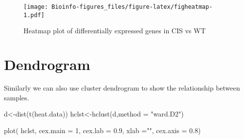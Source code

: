 \documentclass[
  openany]{book}
\newenvironment{Shaded}{\begin{snugshade}}{\end{snugshade}}
\newcommand{\AttributeTok}[1]{\textcolor[rgb]{0.77,0.63,0.00}{#1}}
\newcommand{\DecValTok}[1]{\textcolor[rgb]{0.00,0.00,0.81}{#1}}
\newcommand{\FloatTok}[1]{\textcolor[rgb]{0.00,0.00,0.81}{#1}}
\newcommand{\FunctionTok}[1]{\textcolor[rgb]{0.00,0.00,0.00}{#1}}
\newcommand{\NormalTok}[1]{#1}
\newcommand{\OtherTok}[1]{\textcolor[rgb]{0.56,0.35,0.01}{#1}}
\newcommand{\SpecialCharTok}[1]{\textcolor[rgb]{0.00,0.00,0.00}{#1}}
\newcommand{\StringTok}[1]{\textcolor[rgb]{0.31,0.60,0.02}{#1}}
\begin{document}
\begin{Shaded}
\end{Shaded}

\begin{figure}
\centering
\texttt{[image: Bioinfo-figures\_files/figure-latex/figheatmap-1.pdf]}
\caption{\label{fig:figheatmap}Heatmap plot of differentially expressed genes in CIS vs WT}
\end{figure}

\hypertarget{dendrogram}{%
\section{Dendrogram}\label{dendrogram}}

Similarly we can also use cluster dendrogram to show the relationship between samples.

\begin{Shaded}
\begin{Highlighting}[]
\NormalTok{d}\OtherTok{\textless{}{-}}\FunctionTok{dist}\NormalTok{(}\FunctionTok{t}\NormalTok{(heat.data))}
\NormalTok{hclst}\OtherTok{\textless{}{-}}\FunctionTok{hclust}\NormalTok{(d,}\AttributeTok{method =} \StringTok{"ward.D2"}\NormalTok{)}
\end{Highlighting}
\end{Shaded}

\begin{Shaded}
\begin{Highlighting}[]
\FunctionTok{plot}\NormalTok{(}
\NormalTok{    hclst,}
    \AttributeTok{cex.main =} \DecValTok{1}\NormalTok{,}
    \AttributeTok{cex.lab =} \FloatTok{0.9}\NormalTok{,}
    \AttributeTok{xlab =}\StringTok{""}\NormalTok{,}
    \AttributeTok{cex.axis =} \FloatTok{0.8}\NormalTok{)}
\end{Highlighting}
\end{Shaded}
\end{document}
